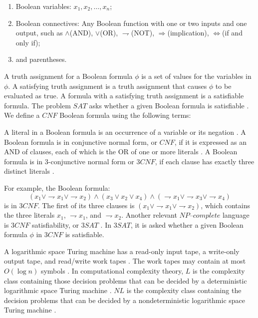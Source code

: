 \documentclass[a4paper,UKenglish,cleveref, autoref]{lipics-v2019}
\begin{document}
\begin{enumerate}
\item Boolean variables: $x_{1}, x_{2},\ldots, x_{n}$;
\item Boolean connectives: Any Boolean function with one or two inputs and one output, such as $\wedge$(AND), $\vee$(OR), $\rightharpoondown$(NOT), $\Rightarrow$(implication), $\Leftrightarrow$(if and only if);
\item and parentheses.
\end{enumerate}

A truth assignment for a Boolean formula $\phi$ is a set of values for the variables in $\phi$. A satisfying truth assignment is a truth assignment that causes $\phi$ to be evaluated as true. A formula with a satisfying truth assignment is a satisfiable formula. The problem $SAT$ asks whether a given Boolean formula is satisfiable \cite{GJ79}. We define a $CNF$ Boolean formula using the following terms:

A literal in a Boolean formula is an occurrence of a variable or its negation \cite{CLRS01}. A Boolean formula is in conjunctive normal form, or $CNF$, if it is expressed as an AND of clauses, each of which is the OR of one or more literals \cite{CLRS01}. A Boolean formula is in 3-conjunctive normal form or $3CNF$, if each clause has exactly three distinct literals \cite{CLRS01}.

For example, the Boolean formula:
\[(x_{1} \vee \rightharpoondown x_{1} \vee \rightharpoondown x_{2}) \wedge (x_{3} \vee x_{2} \vee x_{4}) \wedge (\rightharpoondown x_{1} \vee \rightharpoondown x_{3} \vee \rightharpoondown x_{4})\]
is in $3CNF$. The first of its three clauses is $(x_{1} \vee \rightharpoondown x_{1} \vee \rightharpoondown x_{2})$, which contains the three literals $x_{1}$, $\rightharpoondown x_{1}$, and $\rightharpoondown x_{2}$. Another relevant $\textit{NP--complete}$ language is $3CNF$ satisfiability, or $3SAT$ \cite{CLRS01}. In $3SAT$, it is asked whether a given Boolean formula $\phi$ in $3CNF$ is satisfiable.

A logarithmic space Turing machine has a read-only input tape, a write-only output tape, and read/write work tapes \cite{MS06}. The work tapes may contain at most $O(\log n)$ symbols \cite{MS06}. In computational complexity theory, $L$ is the complexity class containing those decision problems that can be decided by a deterministic logarithmic space Turing machine \cite{Pap03}. $NL$ is the complexity class containing the decision problems that can be decided by a nondeterministic logarithmic space Turing machine \cite{Pap03}.
\end{document}
